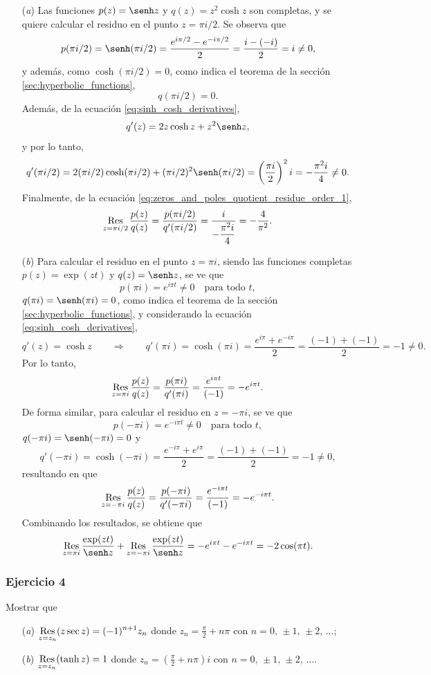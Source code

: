 \documentclass[a4paper]{report}
\def\Res{\qopname\relax m{Res}}
\begin{document}
\begin{enumerate}
 \item[(\textit{a})] Las funciones \(p(z)=\senh z\) y \(q(z)=z^2\cosh z\) son completas, y se quiere calcular el residuo en el punto \(z=\pi i/2\). Se observa que 
 \[
  p(\pi i/2)=\senh(\pi i/2)=\frac{e^{i\pi/2}-e^{-i\pi/2}}{2}=\frac{i-(-i)}{2}=i\neq0,
 \]
 y además, como \(\cosh(\pi i/2)=0\), como indica el teorema de la sección \ref{sec:hyperbolic_functions},
 \[
  q(\pi i/2)=0.
 \]
 Además, de la ecuación \ref{eq:sinh_cosh_derivatives},
 \[
  q'(z)=2z\cosh z+z^2\senh z,
 \]
 y por lo tanto,
 \[
  q'(\pi i/2)=2(\pi i/2)\cosh(\pi i/2)+(\pi i/2)^2\senh(\pi i/2)=\left(\frac{\pi i}{2}\right)^2i=-\frac{\pi^2i}{4}\neq0.
 \]
 Finalmente, de la ecuación \ref{eq:zeros_and_poles_quotient_residue_order_1},
 \[
  \Res_{z=\pi i/2}\frac{p(z)}{q(z)}=\frac{p(\pi i/2)}{q'(\pi i/2)}=\dfrac{i}{-\dfrac{\pi^2i}{4}}=-\frac{4}{\pi^2}.
 \]
 \item[(\textit{b})] Para calcular el residuo en el punto \(z=\pi i\), siendo las funciones completas \(p(z)=\exp(zt)\) y \(q(z)=\senh z\), se ve que 
 \[
  p(\pi i)=e^{i\pi t}\neq0
  \quad\textrm{para todo }t,
 \]
 \(q(\pi i)=\senh(\pi i)=0\), como indica el teorema de la sección \ref{sec:hyperbolic_functions}, y considerando la ecuación \ref{eq:sinh_cosh_derivatives},
 \[
  q'(z)=\cosh z
  \qquad\Rightarrow\qquad 
  q'(\pi i)=\cosh(\pi i)=\frac{e^{i\pi}+e^{-i\pi}}{2}=\frac{(-1)+(-1)}{2}=-1\neq0.
 \]
 Por lo tanto,
 \[
  \Res_{z=\pi i}\frac{p(z)}{q(z)}=\frac{p(\pi i)}{q'(\pi i)}=\frac{e^{i\pi t}}{(-1)}=-e^{i\pi t}.
 \]
 De forma similar, para calcular el residuo en \(z=-\pi i\), se ve que 
 \[
  p(-\pi i)=e^{-i\pi t}\neq0
  \quad\textrm{para todo }t,
 \]
 \(q(-\pi i)=\senh(-\pi i)=0\) y
 \[
  q'(-\pi i)=\cosh(-\pi i)=\frac{e^{-i\pi}+e^{i\pi}}{2}=\frac{(-1)+(-1)}{2}=-1\neq0,
 \]
 resultando en que 
 \[
  \Res_{z=-\pi i}\frac{p(z)}{q(z)}=\frac{p(-\pi i)}{q'(-\pi i)}=\frac{e^{-i\pi t}}{(-1)}=-e^{-i\pi t}.
 \]
 Combinando los resultados, se obtiene que 
 \[
  \Res_{z=\pi i}\frac{\exp(zt)}{\senh z}+\Res_{z=-\pi i}\frac{\exp(zt)}{\senh z}=-e^{i\pi t}-e^{-i\pi t}=-2\cos(\pi t).
 \]
\end{enumerate}

\subsubsection{Ejercicio 4}

Mostrar que 
\begin{enumerate}
 \item[(\textit{a})] \(\displaystyle\Res_{z=z_n}(z\sec z)=(-1)^{n+1}z_n\) donde \(\displaystyle z_n=\frac{\pi}{2}+n\pi\) con \(n=0,\,\pm1,\,\pm2,\,\dots\);
 \item[(\textit{b})] 
 \(\displaystyle\Res_{z=z_n}(\tanh z)=1\) donde \(\displaystyle z_n=\left(\frac{\pi}{2}+n\pi\right)i\) con \(n=0,\,\pm1,\,\pm2,\,\dots\).
\end{enumerate}
\end{document}
